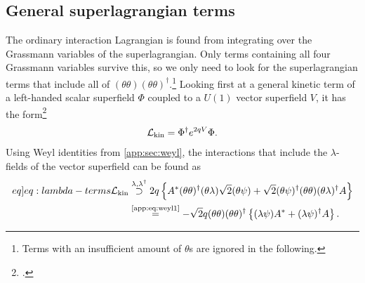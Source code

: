 \documentclass[english, notitlepage]{article}
\begin{document}
\subsection{General superlagrangian terms}
The ordinary interaction Lagrangian is found from integrating over the
Grassmann variables of the superlagrangian. Only terms containing all four
Grassmann variables survive this, so we only need to look for the
superlagrangian terms that include all of
\((\theta\theta)(\theta\theta)^\dagger\).\footnote{Terms with an
    insufficient
    amount of \(\theta\)s are ignored in the following.} Looking first at a
general
kinetic term of a left-handed scalar superfield \(\Phi\) coupled to a
\(U(1)\)
vector superfield \(V\), it has the form\footcite{Binetruy:2006ad}
\begin{align}
    {\mathcal{L}}_\text{kin} = \Phi^\dag e^{2qV} \Phi.
\end{align}
Using Weyl identities from \cref{app:sec:weyl}, the interactions that
include
the \(\lambda\)-fields of the vector superfield can be found as
\begin{align}
    \label[eq]{eq:lambda-terms}
    \nonumber
    \msub{\L}{kin} & \stackrel{\lambda, \lambda^\dagger}{\supset}
    2q\cclosed{
        A^\ast (\theta\theta)^\dagger(\theta\lambda) \sqrt{2} (\theta\psi)
        +
        \sqrt{2}
        (\theta\psi)^\dagger (\theta\theta)(\theta\lambda)^\dagger A }
    \\
                   & \stackrel{\text{\cref{app:eq:weyl1}}}{=} -\sqrt{2}q
    (\theta\theta)(\theta\theta)^\dagger \cclosed{ (\lambda\psi)A^\ast +
        (\lambda\psi)^\dagger A }.
\end{align}
\end{document}
